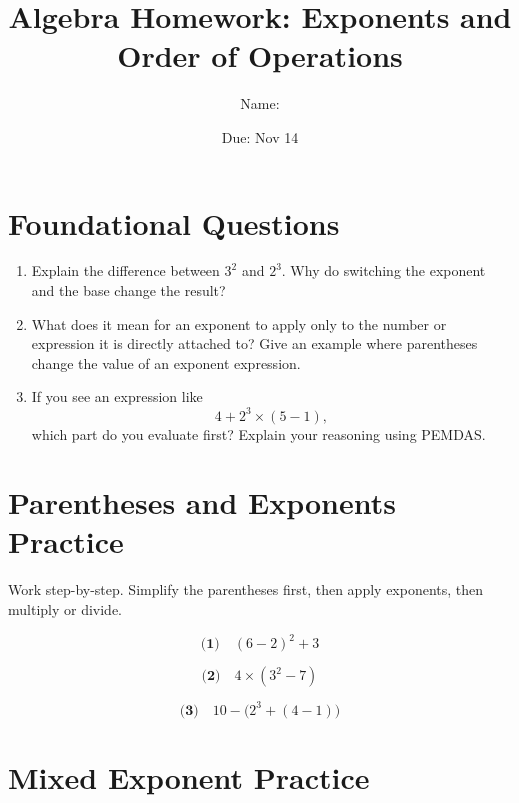 \documentclass[11pt]{article}
\title{Algebra Homework: Exponents and Order of Operations}
\author{Name: \underline{\hspace{3cm}}}
\date{Due: Nov 14}
\begin{document}
\maketitle

\section*{Foundational Questions}

\begin{enumerate}
    \item Explain the difference between \(3^2\) and \(2^3\).  
    Why do switching the exponent and the base change the result?

    \item What does it mean for an exponent to apply only to the number or expression it is directly attached to?  
    Give an example where parentheses change the value of an exponent expression.

    \item If you see an expression like  
    \[
        4 + 2^3 \times (5 - 1),
    \]  
    which part do you evaluate first? Explain your reasoning using PEMDAS.
\end{enumerate}

\vspace{1cm}

\section*{Parentheses and Exponents Practice}

Work step-by-step. Simplify the parentheses first, then apply exponents, then multiply or divide.

\[
\textbf{(1)} \quad (6 - 2)^2 + 3
\]

\vspace{1.4cm}

\[
\textbf{(2)} \quad 4 \times (3^2 - 7)
\]

\vspace{1.4cm}

\[
\textbf{(3)} \quad 10 - \big( 2^3 + (4 - 1) \big)
\]

\vspace{1.8cm}

\newpage
\section*{Mixed Exponent Practice}
\end{document}
